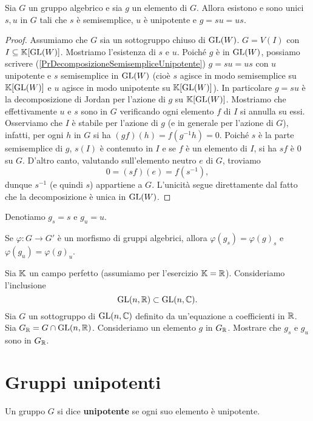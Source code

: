 \begin{theorem} Sia $G$ un gruppo algebrico e sia $g$ un elemento di $G$. Allora esistono e sono unici $s,u$ in $G$ tali che $s$ è semisemplice, $u$ è unipotente e $g=su=us$.
\end{theorem}
\begin{proof}
    Assumiamo che $G$ sia un sottogruppo chiuso di $\operatorname{GL}(W)$. $G=V(I)$ con $I\subseteq \mathbb{K}[\operatorname{GL}(W)]$. Mostriamo l'esistenza di $s$ e $u$. Poiché $g$ è in $\operatorname{GL}(W)$, possiamo scrivere (\ref{PrDecomposizioneSemisempliceUnipotente}) $g=su=us$ con $u$ unipotente e $s$ semisemplice in $\operatorname{GL}(W)$ (cio\`e $s$ agisce in modo semisemplice su $\mathbb{K}[\operatorname{GL}(W)]$ e $u$ agisce in modo unipotente su $\mathbb{K}[\operatorname{GL}(W)]$). In particolare $g=su$ è la decomposizione di Jordan per l'azione di $g$ su $\mathbb{K}[\operatorname{GL}(W)]$.
    Mostriamo che effettivamente $u$ e $s$ sono in $G$ verificando ogni elemento $f$ di $I$ si annulla su essi. Osserviamo che $I$ è stabile per l'azione di $g$ (e in generale per l'azione di $G$), infatti, per ogni $h$ in $G$ si ha $(gf)(h)=f(g^{-1}h)=0$. Poiché $s$ è la parte semisemplice di $g$, $s(I)$ è contenuto in $I$ e se $f$ è un elemento di $I$, si ha $sf$ è $0$ su $G$. D'altro canto, valutando sull'elemento neutro $e$ di $G$, troviamo \[0=(sf)(e)=f(s^{-1}),\] dunque $s^{-1}$ (e quindi $s$) appartiene a $G$. L'unicità segue direttamente dal fatto che la decomposizione è unica in $\operatorname{GL}(W)$.
\end{proof}
\begin{notation}
    Denotiamo $g_s=s$ e $g_u=u$.
\end{notation}
\begin{exercise}
    Se $\varphi\colon G \to G'$ è un morfismo di gruppi algebrici, allora $\varphi(g_s)=\varphi(g)_s$ e $\varphi(g_u)=\varphi(g)_u$.
\end{exercise}

\begin{exercise}
    Sia $\mathbb{K}$ un campo perfetto (assumiamo per l'esercizio $\mathbb{K}=\mathbb{R}$). Consideriamo l'inclusione \[\operatorname{GL}(n,\mathbb{R})\subset \operatorname{GL}(n,\mathbb{C}).\]
    Sia $G$ un sottogruppo di $\operatorname{GL}(n,\mathbb{C})$ definito da un'equazione a coefficienti in $\mathbb{R}$. Sia $G_{\mathbb{R}}=G\cap \operatorname{GL}(n,\mathbb{R})$. Consideriamo un elemento $g$ in $G_{\mathbb{R}}$. Mostrare che $g_s$ e $g_u$ sono in $G_{\mathbb{R}}$.
\end{exercise}


\section{Gruppi unipotenti}
\begin{definition}
    Un gruppo $G$ si dice \textbf{unipotente} se ogni suo elemento è unipotente.
\end{definition}

